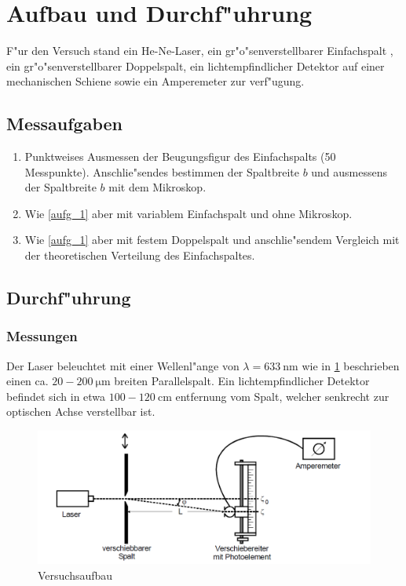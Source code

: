 \section{Aufbau und Durchf"uhrung}
	\label{sec:durchfueuhrung}
	F"ur den Versuch stand ein He-Ne-Laser, ein gr"o"senverstellbarer Einfachspalt , ein gr"o"senverstellbarer Doppelspalt, ein lichtempfindlicher Detektor auf einer mechanischen Schiene sowie ein Amperemeter zur verf"ugung.

	\subsection{Messaufgaben}
		\begin{enumerate}
			\item \label{aufg_1} Punktweises Ausmessen der Beugungsfigur des Einfachspalts (50 Messpunkte). Anschlie"sendes bestimmen der Spaltbreite $b$ und ausmessens der Spaltbreite $b$ mit dem Mikroskop.

			\item \label{aufg_2} Wie \ref{aufg_1} aber mit variablem Einfachspalt und ohne Mikroskop. 

			\item \label{aufg_3} Wie \ref{aufg_1} aber mit festem Doppelspalt und anschlie"sendem Vergleich mit der theoretischen Verteilung des Einfachspaltes.
		\end{enumerate}

	\subsection{Durchf"uhrung}
		\label{sec:durchfuehrung}
		\subsubsection{Messungen}
			\label{sec:messung}

			Der Laser beleuchtet mit einer Wellenl"ange von $\lambda = \SI{633}{\nano \meter}$ wie in \ref{Versuchsaufbau} beschrieben einen ca. $20 - 200 \SI{}{\micro \meter}$ breiten Parallelspalt. Ein lichtempfindlicher Detektor befindet sich in etwa $100 - 120 \SI{}{\centi \meter}$ entfernung vom Spalt, welcher senkrecht zur optischen Achse verstellbar ist.

			\begin{figure}[h]
					\centering
					\includegraphics[width = 14cm]{Versuchsaufbau.png}
					\caption{Versuchsaufbau}
					\label{Versuchsaufbau}
			\end{figure}

